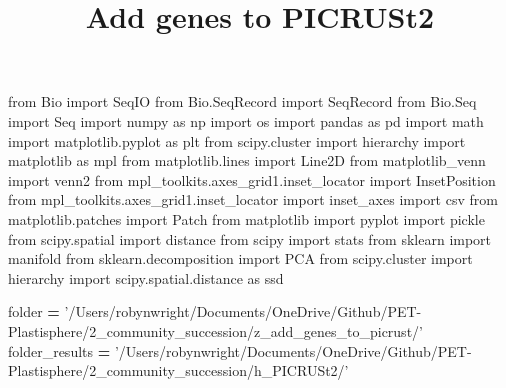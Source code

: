 \documentclass[
]{article}
\title{Add genes to PICRUSt2}
\author{}
\date{\vspace{-2.5em}}
\newenvironment{Shaded}{\begin{snugshade}}{\end{snugshade}}
\newcommand{\ImportTok}[1]{#1}
\newcommand{\NormalTok}[1]{#1}
\newcommand{\OperatorTok}[1]{\textcolor[rgb]{0.81,0.36,0.00}{\textbf{#1}}}
\newcommand{\StringTok}[1]{\textcolor[rgb]{0.31,0.60,0.02}{#1}}
\begin{document}
\maketitle

{
\setcounter{tocdepth}{2}
\tableofcontents
}
\begin{Shaded}
\begin{Highlighting}[]
\ImportTok{from}\NormalTok{ Bio }\ImportTok{import}\NormalTok{ SeqIO}
\ImportTok{from}\NormalTok{ Bio.SeqRecord }\ImportTok{import}\NormalTok{ SeqRecord}
\ImportTok{from}\NormalTok{ Bio.Seq }\ImportTok{import}\NormalTok{ Seq}
\ImportTok{import}\NormalTok{ numpy }\ImportTok{as}\NormalTok{ np}
\ImportTok{import}\NormalTok{ os}
\ImportTok{import}\NormalTok{ pandas }\ImportTok{as}\NormalTok{ pd}
\ImportTok{import}\NormalTok{ math}
\ImportTok{import}\NormalTok{ matplotlib.pyplot }\ImportTok{as}\NormalTok{ plt}
\ImportTok{from}\NormalTok{ scipy.cluster }\ImportTok{import}\NormalTok{ hierarchy}
\ImportTok{import}\NormalTok{ matplotlib }\ImportTok{as}\NormalTok{ mpl}
\ImportTok{from}\NormalTok{ matplotlib.lines }\ImportTok{import}\NormalTok{ Line2D}
\ImportTok{from}\NormalTok{ matplotlib_venn }\ImportTok{import}\NormalTok{ venn2}
\ImportTok{from}\NormalTok{ mpl_toolkits.axes_grid1.inset_locator }\ImportTok{import}\NormalTok{ InsetPosition}
\ImportTok{from}\NormalTok{ mpl_toolkits.axes_grid1.inset_locator }\ImportTok{import}\NormalTok{ inset_axes}
\ImportTok{import}\NormalTok{ csv}
\ImportTok{from}\NormalTok{ matplotlib.patches }\ImportTok{import}\NormalTok{ Patch}
\ImportTok{from}\NormalTok{ matplotlib }\ImportTok{import}\NormalTok{ pyplot}
\ImportTok{import}\NormalTok{ pickle}
\ImportTok{from}\NormalTok{ scipy.spatial }\ImportTok{import}\NormalTok{ distance}
\ImportTok{from}\NormalTok{ scipy }\ImportTok{import}\NormalTok{ stats}
\ImportTok{from}\NormalTok{ sklearn }\ImportTok{import}\NormalTok{ manifold}
\ImportTok{from}\NormalTok{ sklearn.decomposition }\ImportTok{import}\NormalTok{ PCA}
\ImportTok{from}\NormalTok{ scipy.cluster }\ImportTok{import}\NormalTok{ hierarchy}
\ImportTok{import}\NormalTok{ scipy.spatial.distance }\ImportTok{as}\NormalTok{ ssd}

\NormalTok{folder }\OperatorTok{=} \StringTok{'/Users/robynwright/Documents/OneDrive/Github/PET-Plastisphere/2_community_succession/z_add_genes_to_picrust/'}
\NormalTok{folder_results }\OperatorTok{=} \StringTok{'/Users/robynwright/Documents/OneDrive/Github/PET-Plastisphere/2_community_succession/h_PICRUSt2/'}
\end{Highlighting}
\end{Shaded}
\end{document}
